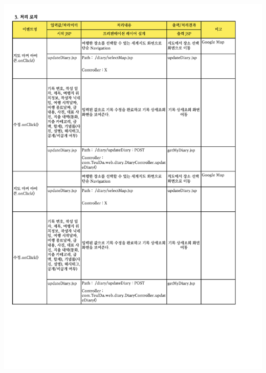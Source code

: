{{{{{{{{{{{{\includegraphics[width=20cm]{./Figure/Analysis/Display/diary/diary_11.pdf} \\
}}}}}}}}}}}}
